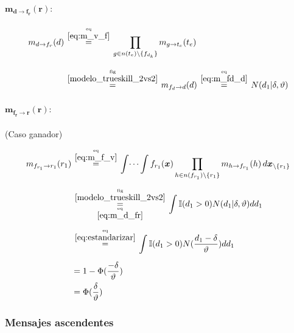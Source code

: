 \documentclass[article]{jss}
\newcommand\hfrac[2]{\genfrac{}{}{0pt}{}{#1}{#2}} %
\begin{document}
\begin{appendix}
\paragraph{$\bm{m_{d \rightarrow f_r}(r)}:$}

\begin{equation}\label{eq:m_d_fr}
\begin{split}
m_{d \rightarrow f_r}(d) & \overset{\hfrac{\text{eq}}{\ref{eq:m_v_f}}}{=} \prod_{g \in n(t_e) \setminus  \{f_{d_{k}} \}} m_{g \rightarrow t_e} (t_e) \\[0.3cm] 
 & \overset{\hfrac{\text{fig}}{\ref{modelo_trueskill_2vs2}}}{=} m_{f_d \rightarrow d}(d) \overset{\hfrac{\text{eq}}{\ref{eq:m_fd_d}}}{=} N(d_1| \delta, \vartheta)
\end{split}
\end{equation}

\paragraph{$\bm{m_{f_r \rightarrow r}(r)}:$} (Caso ganador)

\begin{equation}\label{eq:m_fr_r}
\begin{split}
 m_{f_{r_1} \rightarrow r_1}(r_1) & \overset{\hfrac{\text{eq}}{\ref{eq:m_f_v}}}{=} \int \dots \int f_{r_1}(\bm{x}) \prod_{h \in n(f_{r_1}) \setminus \{r_1\} } m_{h \rightarrow f_{r_1}}(h) \, d\bm{x}_{\setminus \{r_1\} }  \\[0.2cm]
 & \overset{\hfrac{\text{fig}}{\ref{modelo_trueskill_2vs2}}}{\underset{\hfrac{\text{eq}}{\ref{eq:m_d_fr}}}{=}} \int \mathbb{I}(d_1 > 0) N(d_1 | \delta, \vartheta)  dd_1 \\[0.2cm]
 &  \overset{\hfrac{\text{eq}}{\ref{eq:estandarizar}}}{=} \int \mathbb{I}(d_1 > 0) N( \frac{d_1 - \delta}{\vartheta}) dd_1 \\[0.2cm]
 & = 1 - \Phi(\frac{-\delta}{\vartheta}) \\
 & = \Phi(\frac{\delta}{\vartheta})
\end{split}
\end{equation}













\subsubsection{Mensajes ascendentes}


\end{appendix}
\end{document}
